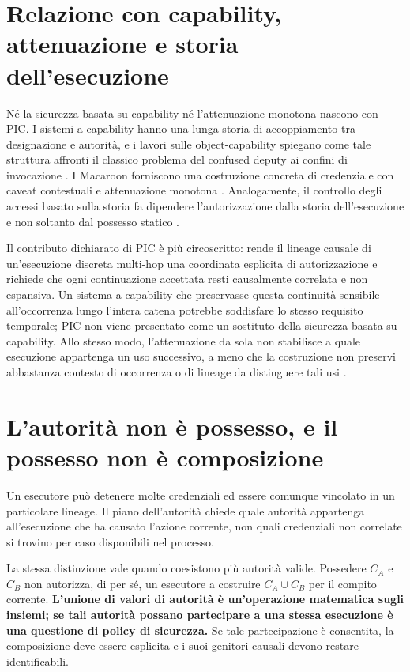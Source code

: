 \documentclass[10pt,oneside,openany]{book}
\begin{document}
\section{Relazione con capability, attenuazione e storia dell'esecuzione}
Né la sicurezza basata su capability né l'attenuazione monotona nascono con PIC. I sistemi a capability hanno una lunga storia di accoppiamento tra designazione e autorità, e i lavori sulle object-capability spiegano come tale struttura affronti il classico problema del confused deputy ai confini di invocazione \cite{dennis1966,miller2003,hardy1988}. I Macaroon forniscono una costruzione concreta di credenziale con caveat contestuali e attenuazione monotona \cite{birgisson2014}. Analogamente, il controllo degli accessi basato sulla storia fa dipendere l'autorizzazione dalla storia dell'esecuzione e non soltanto dal possesso statico \cite{abadi2003}.

Il contributo dichiarato di PIC è più circoscritto: rende il lineage causale di un'esecuzione discreta multi-hop una coordinata esplicita di autorizzazione e richiede che ogni continuazione accettata resti causalmente correlata e non espansiva. Un sistema a capability che preservasse questa continuità sensibile all'occorrenza lungo l'intera catena potrebbe soddisfare lo stesso requisito temporale; PIC non viene presentato come un sostituto della sicurezza basata su capability. Allo stesso modo, l'attenuazione da sola non stabilisce a quale esecuzione appartenga un uso successivo, a meno che la costruzione non preservi abbastanza contesto di occorrenza o di lineage da distinguere tali usi \cite{gallo2026pic}.

\section{L'autorità non è possesso, e il possesso non è composizione}
Un esecutore può detenere molte credenziali ed essere comunque vincolato in un particolare lineage. Il piano dell'autorità chiede quale autorità appartenga all'esecuzione che ha causato l'azione corrente, non quali credenziali non correlate si trovino per caso disponibili nel processo.

La stessa distinzione vale quando coesistono più autorità valide. Possedere $C_A$ e $C_B$ non autorizza, di per sé, un esecutore a costruire $C_A \cup C_B$ per il compito corrente. \textbf{L'unione di valori di autorità è un'operazione matematica sugli insiemi; se tali autorità possano partecipare a una stessa esecuzione è una questione di policy di sicurezza.} Se tale partecipazione è consentita, la composizione deve essere esplicita e i suoi genitori causali devono restare identificabili.
\end{document}
